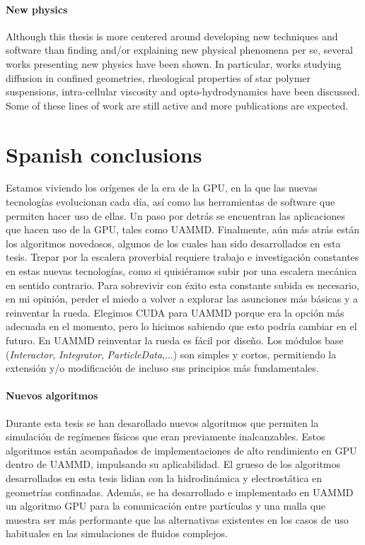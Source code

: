 \documentclass[twoside,openright,titlepage,numbers=noenddot,%
headinclude,footinclude,cleardoublepage=empty,abstract=on,
BCOR=5mm,fontsize=11pt, dvipsnames, paper=b5
]{scrreprt}
\begin{document}
\subsubsection*{New physics}
Although this thesis is more centered around developing new techniques and software than finding and/or explaining new physical phenomena per se, several works presenting new physics have been shown. In particular, works studying diffusion in confined geometries, rheological properties of star polymer suspensions, intra-cellular viscosity and opto-hydrodynamics have been discussed. Some of these lines of work are still active and more publications are expected.



\chapter{Spanish conclusions}
Estamos viviendo los orígenes de la era de la GPU, en la que las nuevas tecnologías evolucionan cada día, así como las herramientas de software que permiten hacer uso de ellas. Un paso por detrás se encuentran las aplicaciones que hacen uso de la GPU, tales como UAMMD. Finalmente, aún más atrás están los algoritmos novedosos, algunos de los cuales han sido desarrollados en esta tesis. Trepar por la escalera proverbial requiere trabajo e investigación constantes en estas nuevas tecnologías, como si quisiéramos subir por una escalera mecánica en sentido contrario. Para sobrevivir con éxito esta constante subida es necesario, en mi opinión, perder el miedo a volver a explorar las asunciones más básicas y a reinventar la rueda. Elegimos CUDA para UAMMD porque era la opción más adecuada en el momento, pero lo hicimos sabiendo que esto podría cambiar en el futuro. En UAMMD reinventar la rueda es fácil por diseño. Los módulos base (\emph{Interactor}, \emph{Integrator}, \emph{ParticleData},...) son simples y cortos, permitiendo la extensión y/o modificación de incluso sus principios más fundamentales.

\subsubsection*{Nuevos algoritmos}
Durante esta tesis se han desarollado nuevos algoritmos que permiten la simulación de regímenes físicos que eran previamente inalcanzables. Estos algoritmos están acompañados de implementaciones de alto rendimiento en GPU dentro de UAMMD, impulsando su aplicabilidad. El grueso de los algoritmos desarrollados en esta tesis lidian con la hidrodinámica y electrostática en geometrías confinadas. Además, se ha desarrollado e implementado en UAMMD un algoritmo GPU para la comunicación entre partículas y una malla que muestra ser más performante que las alternativas existentes en los casos de uso habituales en las simulaciones de fluidos complejos.
\end{document}
